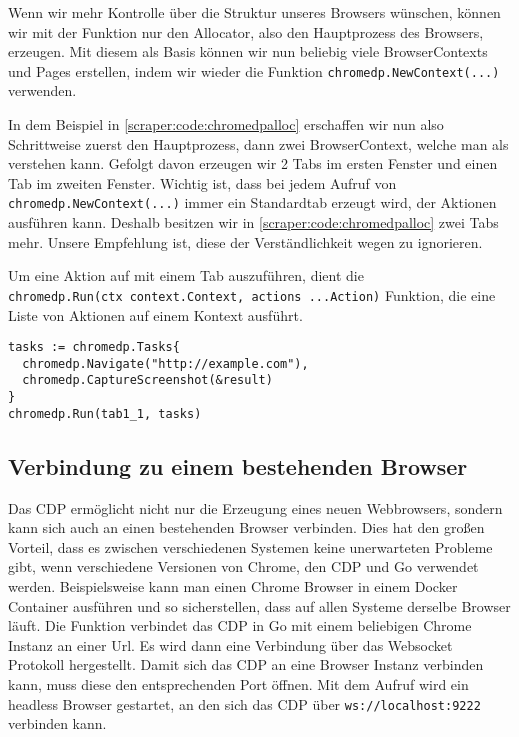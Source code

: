 
Wenn wir mehr Kontrolle über die Struktur unseres Browsers wünschen, können wir mit der Funktion  nur den Allocator, also den Hauptprozess des Browsers, erzeugen. Mit diesem als Basis können wir nun beliebig viele BrowserContexts und Pages erstellen, indem wir wieder die Funktion \texttt{chromedp.NewContext(...)} verwenden. 


In dem Beispiel in \autoref{scraper:code:chromedpalloc} erschaffen wir nun also Schrittweise zuerst den Hauptprozess, dann zwei BrowserContext, welche man als  verstehen kann. Gefolgt davon erzeugen wir 2 Tabs im ersten Fenster und einen Tab im zweiten Fenster. Wichtig ist, dass bei jedem Aufruf von \texttt{chromedp.NewContext(...)} immer ein Standardtab erzeugt wird, der Aktionen ausführen kann. Deshalb besitzen wir in \autoref{scraper:code:chromedpalloc} zwei Tabs mehr. Unsere Empfehlung ist, diese der Verständlichkeit wegen zu ignorieren. 

Um eine Aktion auf mit einem Tab auszuführen, dient die \\
\texttt{chromedp.Run(ctx context.Context, actions ...Action)} Funktion, die eine Liste von Aktionen auf einem Kontext ausführt. 
\begin{verbatim}
tasks := chromedp.Tasks{
  chromedp.Navigate("http://example.com"),
  chromedp.CaptureScreenshot(&result)
}
chromedp.Run(tab1_1, tasks)
\end{verbatim}
\pagebreak
\subsection{Verbindung zu einem bestehenden Browser} \label{scraper:subsec:go:remote}
Das CDP ermöglicht nicht nur die Erzeugung eines neuen Webbrowsers, sondern kann sich auch an einen bestehenden Browser verbinden. Dies hat den großen Vorteil, dass es zwischen verschiedenen Systemen keine unerwarteten Probleme gibt, wenn verschiedene Versionen von Chrome, den CDP und Go verwendet werden. Beispielsweise kann man einen Chrome Browser in einem Docker Container ausführen und so sicherstellen, dass auf allen Systeme derselbe Browser läuft. Die Funktion  verbindet das CDP in Go mit einem beliebigen Chrome Instanz an einer Url. Es wird dann eine Verbindung über das Websocket Protokoll hergestellt. Damit sich das CDP an eine Browser Instanz verbinden kann, muss diese den entsprechenden Port öffnen. Mit dem Aufruf  wird ein headless Browser gestartet, an den sich das CDP über  \verb|ws://localhost:9222| verbinden kann.

